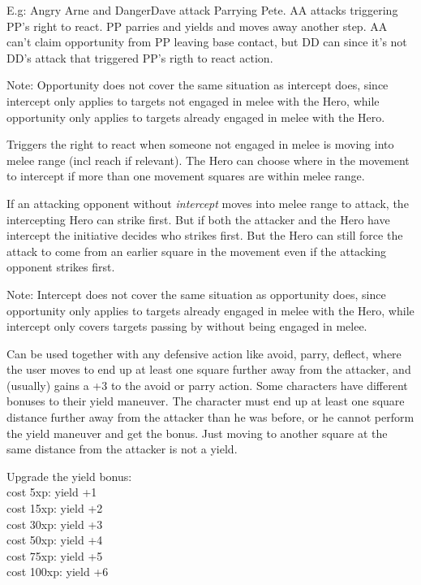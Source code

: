 E.g: Angry Arne and DangerDave attack Parrying Pete. AA attacks triggering PP's right to react. PP parries and yields and moves away another step. AA can't claim opportunity from PP leaving base contact, but DD can since it's not DD's attack that triggered PP's rigth to react action.

Note: Opportunity does not cover the same situation as intercept does, since intercept only applies to targets not engaged in melee with the Hero, while opportunity only applies to targets already engaged in melee with the Hero.


Triggers the right to react when someone not engaged in melee is moving into melee range (incl reach if relevant). The Hero can choose where in the movement to intercept if more than one movement squares are within melee range.

If an attacking opponent without \emph{intercept} moves into melee range to attack, the intercepting Hero can strike first. But if both the attacker and the Hero have intercept the initiative decides who strikes first. But the Hero can still force the attack to come from an earlier square in the movement even if the attacking opponent strikes first.

Note: Intercept does not cover the same situation as opportunity does, since opportunity only applies to targets already engaged in melee with the Hero, while intercept only covers targets passing by without being engaged in melee.


Can be used together with any defensive action like avoid, parry, deflect, where the user moves to end up at least one square further away from the attacker, and (usually) gains a +3 to the avoid or parry action. Some characters have different bonuses to their yield maneuver. The character must end up at least one square distance further away from the attacker than he was before, or he cannot perform the yield maneuver and get the bonus. Just moving to another square at the same distance from the attacker is not a yield.

Upgrade the yield bonus: \\
cost   5xp: yield +1 \\
cost  15xp: yield +2 \\
cost  30xp: yield +3 \\
cost  50xp: yield +4 \\
cost  75xp: yield +5 \\
cost 100xp: yield +6

